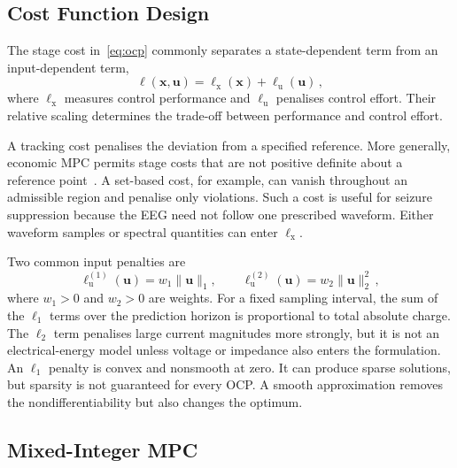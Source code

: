 \subsection{Cost Function Design}
\label{sec:cost_design}

The stage cost in~\eqref{eq:ocp} commonly separates a state-dependent term from an
input-dependent term,
%
\begin{equation*}
    \ell(\mathbf{x}, \mathbf{u})
    = \ell_\mathrm{x}(\mathbf{x}) + \ell_\mathrm{u}(\mathbf{u}) \,,
\end{equation*}
%
where $\ell_\mathrm{x}$ measures control performance and $\ell_\mathrm{u}$ penalises control
effort. Their relative scaling determines the trade-off between performance and control
effort.

A tracking cost penalises the deviation from a specified reference. More generally,
economic MPC permits stage costs that are not positive definite about a reference
point~\cite{Ellis2014}. A set-based cost, for example, can vanish throughout an admissible %
region and penalise only violations. Such a cost is useful for seizure suppression because the EEG
need not follow one prescribed waveform. Either waveform samples or spectral quantities can
enter $\ell_\mathrm{x}$.

Two common input penalties are
%
\begin{equation}
    \ell_\mathrm{u}^{(1)}(\mathbf{u})
    = w_1\|\mathbf{u}\|_1,
    \qquad
    \ell_\mathrm{u}^{(2)}(\mathbf{u})
    = w_2\|\mathbf{u}\|_2^2 \,,
    \label{eq:input_penalty}
\end{equation}
%
where $w_1 > 0$ and $w_2 > 0$ are weights. For a fixed sampling interval, the sum of the
$\ell_1$ terms over the prediction horizon is proportional to total absolute charge. The
$\ell_2$ term penalises large current magnitudes more strongly, but it is not an
electrical-energy model unless voltage or impedance also enters the formulation. An
$\ell_1$ penalty is convex and nonsmooth at zero.
It can produce sparse solutions, but sparsity is not guaranteed for every OCP. A smooth
approximation removes the nondifferentiability but also changes the optimum.

\subsection{Mixed-Integer MPC}
\label{sec:mi_mpc}

